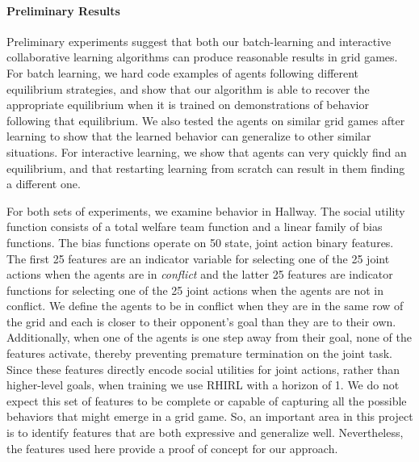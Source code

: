 
\vspace{\up}
\paragraph{Preliminary Results}
\label{sec:results}

Preliminary experiments suggest that both our batch-learning and interactive
collaborative learning algorithms can produce reasonable results in
grid games. For batch learning, we hard code examples of agents
following different equilibrium strategies, and show that our
algorithm is able to recover the appropriate equilibrium when it is
trained on demonstrations of behavior following that equilibrium. We
also tested the agents on similar grid games after learning to show
that the learned behavior can generalize to other similar situations.
For interactive learning, we show that agents can very quickly
find an equilibrium, and that restarting learning from scratch can
result in them finding a different one.

For both sets of experiments, we examine behavior in Hallway.  The
social utility function consists of a total welfare team 
function and a linear family of bias functions. The bias functions
operate on 50 state, joint action binary features. The first 25
features are an indicator variable for selecting one of the 25 joint
actions when the agents are in {\em conflict\/} and the latter 25
features are indicator functions for selecting one of the 25 joint
actions when the agents are not in conflict. We define the agents to be
in conflict when they are in the same row of the grid and each is
closer to their opponent's goal than they are to their
own. Additionally, when one of the agents is one step away from their
goal, none of the features activate, thereby preventing premature
termination on the joint task. Since these features directly encode
social utilities for joint actions, rather than higher-level goals, when
training we use RHIRL with a horizon of 1. We do not expect this
set of features to be complete or capable of capturing all the
possible behaviors that might emerge in a grid game. So, an important
area in this project is to identify features that are both expressive
and generalize well. Nevertheless, the features used here provide a
proof of concept for our approach.

